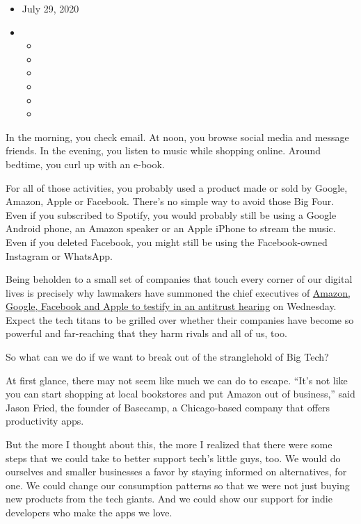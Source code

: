 \begin{itemize}
\item
  July 29, 2020
\item
  \begin{itemize}
  \item
  \item
  \item
  \item
  \item
  \item
  \end{itemize}
\end{itemize}

In the morning, you check email. At noon, you browse social media and
message friends. In the evening, you listen to music while shopping
online. Around bedtime, you curl up with an e-book.

For all of those activities, you probably used a product made or sold by
Google, Amazon, Apple or Facebook. There's no simple way to avoid those
Big Four. Even if you subscribed to Spotify, you would probably still be
using a Google Android phone, an Amazon speaker or an Apple iPhone to
stream the music. Even if you deleted Facebook, you might still be using
the Facebook-owned Instagram or WhatsApp.

Being beholden to a small set of companies that touch every corner of
our digital lives is precisely why lawmakers have summoned the chief
executives of
\href{https://www.nytimes.com/2020/07/28/technology/amazon-apple-facebook-google-antitrust-hearing.html}{Amazon,
Google, Facebook and Apple to testify in an antitrust hearing} on
Wednesday. Expect the tech titans to be grilled over whether their
companies have become so powerful and far-reaching that they harm rivals
and all of us, too.

So what can we do if we want to break out of the stranglehold of Big
Tech?

At first glance, there may not seem like much we can do to escape.
``It's not like you can start shopping at local bookstores and put
Amazon out of business,'' said Jason Fried, the founder of Basecamp, a
Chicago-based company that offers productivity apps.

But the more I thought about this, the more I realized that there were
some steps that we could take to better support tech's little guys, too.
We would do ourselves and smaller businesses a favor by staying informed
on alternatives, for one. We could change our consumption patterns so
that we were not just buying new products from the tech giants. And we
could show our support for indie developers who make the apps we love.

